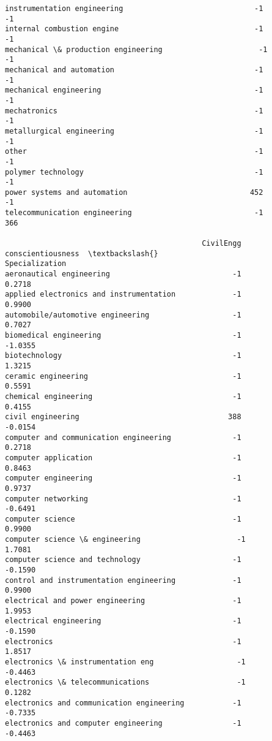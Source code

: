 \documentclass[11pt]{article}
\begin{document}
\begin{tcolorbox}[breakable, size=fbox, boxrule=.5pt, pad at break*=1mm, opacityfill=0]
\begin{Verbatim}[commandchars=\\\{\}]
instrumentation engineering                              -1          -1
internal combustion engine                               -1          -1
mechanical \& production engineering                      -1          -1
mechanical and automation                                -1          -1
mechanical engineering                                   -1          -1
mechatronics                                             -1          -1
metallurgical engineering                                -1          -1
other                                                    -1          -1
polymer technology                                       -1          -1
power systems and automation                            452          -1
telecommunication engineering                            -1         366

                                             CivilEngg  conscientiousness  \textbackslash{}
Specialization
aeronautical engineering                            -1             0.2718
applied electronics and instrumentation             -1             0.9900
automobile/automotive engineering                   -1             0.7027
biomedical engineering                              -1            -1.0355
biotechnology                                       -1             1.3215
ceramic engineering                                 -1             0.5591
chemical engineering                                -1             0.4155
civil engineering                                  388            -0.0154
computer and communication engineering              -1             0.2718
computer application                                -1             0.8463
computer engineering                                -1             0.9737
computer networking                                 -1            -0.6491
computer science                                    -1             0.9900
computer science \& engineering                      -1             1.7081
computer science and technology                     -1            -0.1590
control and instrumentation engineering             -1             0.9900
electrical and power engineering                    -1             1.9953
electrical engineering                              -1            -0.1590
electronics                                         -1             1.8517
electronics \& instrumentation eng                   -1            -0.4463
electronics \& telecommunications                    -1             0.1282
electronics and communication engineering           -1            -0.7335
electronics and computer engineering                -1            -0.4463

\end{Verbatim}
\end{tcolorbox}
\end{document}
